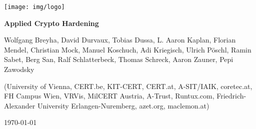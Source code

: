 \begin{titlepage}
  \begin{center}
    \texttt{[image: img/logo]}
    \vspace{45pt}
    \HorRule
    \medskip
    {\fontsize{35}{36} \bfseries Applied Crypto Hardening\par}
    \bigskip
  \end{center}
  \begin{flushleft}
    {\large \color{intersectgreen} Wolfgang Breyha, David Durvaux, Tobias
      Dussa, L. Aaron Kaplan, Florian Mendel, Christian Mock, Manuel Koschuch,
      Adi Kriegisch, Ulrich Pöschl, Ramin Sabet, Berg San, Ralf
      Schlatterbeck, Thomas Schreck, Aaron Zauner, Pepi Zawodsky
      \par}
    \bigskip
    (University of Vienna, CERT.be, KIT-CERT, CERT.at, A-SIT/IAIK, coretec.at, FH
    Campus Wien, VRVis, MilCERT Austria, A-Trust, Runtux.com,
    Friedrich-Alexander University Erlangen-Nuremberg, azet.org, maclemon.at)
  \end{flushleft}
  \medskip
  \HorRule
  \begin{center}
    \today
  \end{center}
\end{titlepage}
